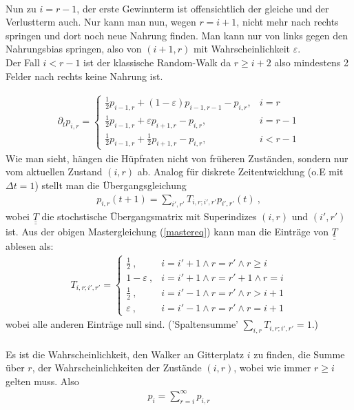 \documentclass[a4paper, 12pt]{report}
\begin{document}
\\
Nun zu $i=r-1$, der erste Gewinnterm ist offensichtlich der gleiche und der Verlustterm auch. Nur kann man nun, wegen $r=i+1$, nicht mehr nach rechts springen und dort noch neue Nahrung finden. Man kann nur von links gegen den Nahrungsbias springen, also von $(i+1,r)$ mit Wahrscheinlichkeit $\varepsilon$.
\\
Der Fall $i<r-1$ ist der klassische Random-Walk da $r\geq i+2$ also mindestens 2 Felder nach rechts keine Nahrung ist. 

\begin{align}\label{mastereq}
\partial_t p_{i,r}=
\begin{cases}
\frac{1}{2}p_{i-1,r} +(1-\varepsilon)p_{i-1,r-1}-p_{i,r}, & i=r
\\
\frac{1}{2}p_{i-1,r} +\varepsilon p_{i+1,r}-p_{i,r}, & i=r-1
\\
\frac{1}{2}p_{i-1,r} +\frac{1}{2} p_{i+1,r}-p_{i,r}, & i<r-1
\end{cases}
\end{align}
Wie man sieht, hängen die Hüpfraten nicht von früheren Zuständen, sondern nur vom aktuellen Zustand $(i,r)$ ab.
\newpage
\noindent Analog für diskrete Zeitentwicklung (o.E mit $\Delta t=1$) stellt man die Übergangsgleichung
\begin{align}
p_{i,r}(t+1)=\sum_{i',r'}T_{i,r;i',r'}p_{i',r'}(t)\ ,
\end{align}
wobei $\underline{\underline{T}}$ die stochstische Übergangsmatrix mit Superindizes $(i,r)$ und $(i',r')$ ist. Aus der obigen Mastergleichung (\ref{mastereq}) kann man die Einträge von $\underline{\underline{T}}$ ablesen als:
\begin{align}
T_{i,r;i',r'}=
\begin{cases}
\frac{1}{2}\ , & i=i'+1 \land r=r' \land r \geq i
\\
1-\varepsilon\ , & i=i'+1 \land r=r'+1 \land r=i
\\
\frac{1}{2}\ , & i=i'-1 \land r=r' \land r > i+1
\\
\varepsilon\ , & i=i'-1 \land r=r' \land r = i+1
\end{cases}
\end{align}
wobei alle anderen Einträge null sind. ('Spaltensumme' $\sum_{i,r}T_{i,r;i',r'}=1$.)
\\
\\
Es ist die Wahrscheinlichkeit, den Walker an Gitterplatz $i$ zu finden, die Summe über $r$, der Wahrscheinlichkeiten der Zustände $(i,r)$, wobei wie immer $r\geq i$ gelten muss. Also
\begin{align}\label{(5)}
p_i = \sum_{r = i}^{\infty}p_{i,r}
\end{align}
\end{document}
